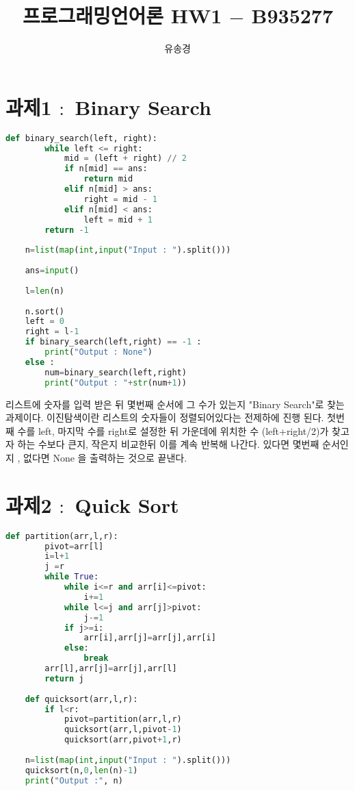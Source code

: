 \documentclass[letterpaper, 10 pt, conference]{ieeeconf}
\title{\LARGE \bf
프로그래밍언어론 HW1 $-$ B935277
 }
\author{유송경$^{}$
}
\begin{document}
\section{과제1 $:$ Binary Search }

\begin{lstlisting}[language=python]
    def binary_search(left, right):
        while left <= right:
            mid = (left + right) // 2
            if n[mid] == ans:
                return mid
            elif n[mid] > ans:
                right = mid - 1
            elif n[mid] < ans:
                left = mid + 1
        return -1
    
    n=list(map(int,input("Input : ").split()))
    
    ans=input()
    
    l=len(n)
    
    n.sort()
    left = 0
    right = l-1
    if binary_search(left,right) == -1 :
        print("Output : None")
    else :
        num=binary_search(left,right)
        print("Output : "+str(num+1))
\end{lstlisting}

\small 리스트에 숫자를 입력 받은 뒤 몇번째 순서에 그 수가 있는지 "Binary Search"로 찾는 과제이다. 이진탐색이란 리스트의 숫자들이 정렬되어있다는 전제하에 진행 된다. 첫번째 수를 left, 마지막 수를 right로 설정한 뒤 가운데에 위치한 수 (left+right/2)가 찾고자 하는 수보다 큰지, 작은지 비교한뒤 이를 계속 반복해 나간다. 있다면 몇번째 순서인지 , 없다면 None 을 출력하는 것으로 끝낸다.

\section{과제2 $:$ Quick Sort}

\begin{lstlisting}[language=python]
     def partition(arr,l,r):
        pivot=arr[l]
        i=l+1
        j =r
        while True:
            while i<=r and arr[i]<=pivot:
                i+=1
            while l<=j and arr[j]>pivot:
                j-=1
            if j>=i:
                arr[i],arr[j]=arr[j],arr[i]
            else:
                break
        arr[l],arr[j]=arr[j],arr[l]
        return j
    
    def quicksort(arr,l,r):
        if l<r:
            pivot=partition(arr,l,r)
            quicksort(arr,l,pivot-1)
            quicksort(arr,pivot+1,r)
    
    n=list(map(int,input("Input : ").split()))
    quicksort(n,0,len(n)-1)
    print("Output :", n)
\end{lstlisting}
\end{document}
